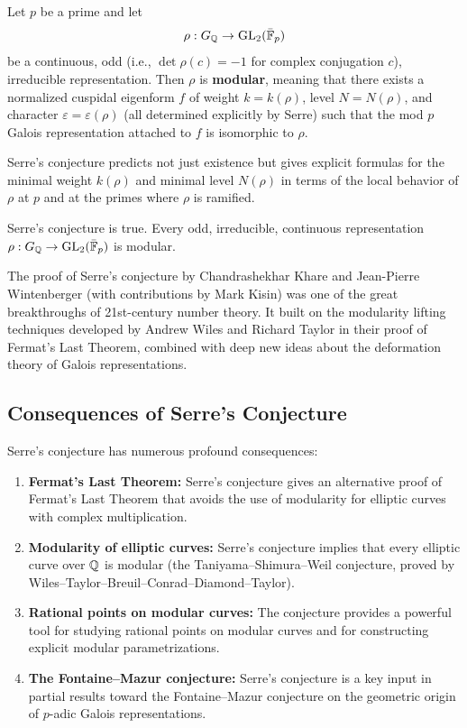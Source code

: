 \begin{condition}
Let \(p\) be a prime and let
\[
\rho: G_{\mathbb{Q}} \to \operatorname{GL}_2(\bar{\mathbb{F}}_p)
\]
be a continuous, odd (i.e., \(\det\rho(c) = -1\) for complex conjugation \(c\)), irreducible representation. Then \(\rho\) is \textbf{modular}, meaning that there exists a normalized cuspidal eigenform \(f\) of weight \(k = k(\rho)\), level \(N = N(\rho)\), and character \(\varepsilon = \varepsilon(\rho)\) (all determined explicitly by Serre) such that the mod \(p\) Galois representation attached to \(f\) is isomorphic to \(\rho\).
\end{condition}

Serre's conjecture predicts not just existence but gives explicit formulas for the minimal weight \(k(\rho)\) and minimal level \(N(\rho)\) in terms of the local behavior of \(\rho\) at \(p\) and at the primes where \(\rho\) is ramified.

\begin{theorem}
Serre's conjecture is true. Every odd, irreducible, continuous representation \(\rho: G_{\mathbb{Q}} \to \operatorname{GL}_2(\bar{\mathbb{F}}_p)\) is modular.
\end{theorem}

The proof of Serre's conjecture by Chandrashekhar Khare and Jean-Pierre Wintenberger (with contributions by Mark Kisin) was one of the great breakthroughs of 21st-century number theory. It built on the modularity lifting techniques developed by Andrew Wiles and Richard Taylor in their proof of Fermat's Last Theorem, combined with deep new ideas about the deformation theory of Galois representations.

\subsection{Consequences of Serre's Conjecture}

Serre's conjecture has numerous profound consequences:

\begin{enumerate}
    \item \textbf{Fermat's Last Theorem:} Serre's conjecture gives an alternative proof of Fermat's Last Theorem that avoids the use of modularity for elliptic curves with complex multiplication.
    \item \textbf{Modularity of elliptic curves:} Serre's conjecture implies that every elliptic curve over \(\mathbb{Q}\) is modular (the Taniyama--Shimura--Weil conjecture, proved by Wiles--Taylor--Breuil--Conrad--Diamond--Taylor).
    \item \textbf{Rational points on modular curves:} The conjecture provides a powerful tool for studying rational points on modular curves and for constructing explicit modular parametrizations.
    \item \textbf{The Fontaine--Mazur conjecture:} Serre's conjecture is a key input in partial results toward the Fontaine--Mazur conjecture on the geometric origin of \(p\)-adic Galois representations.
\end{enumerate}

